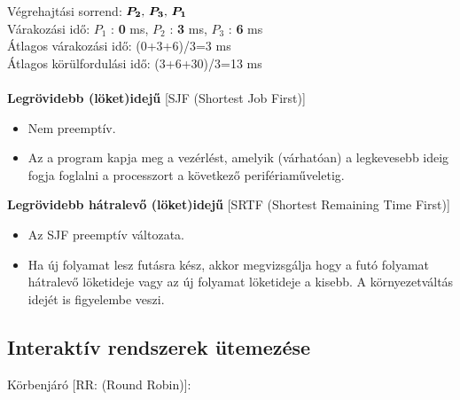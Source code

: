 \documentclass[tikz,12pt,margin=0px]{article}
\begin{document}
    \noindent Végrehajtási sorrend: $\boldsymbol{P_2$, $P_3$, $P_1}$\\
    \noindent Várakozási idő: $P_1$ : \textbf{0} ms, $P_2$ : \textbf{3} ms, $P_3$ : \textbf{6} ms\\

    \noindent Átlagos várakozási idő: (0+3+6)/3=3 ms\\
    \noindent Átlagos körülfordulási idő: (3+6+30)/3=13 ms\\\\

    \noindent \textbf{Legrövidebb (löket)idejű} [SJF (Shortest Job First)]

    \begin{itemize}[topsep=8pt,itemsep=4pt,partopsep=4pt, parsep=4pt]
        \item Nem preemptív.
        \item Az a program kapja meg a vezérlést, amelyik (várhatóan) a legkevesebb ideig fogja foglalni a processzort a következő perifériaműveletig.
    \end{itemize}

    \noindent \textbf{Legrövidebb hátralevő (löket)idejű} [SRTF (Shortest Remaining Time First)]

    \begin{itemize}[topsep=8pt,itemsep=4pt,partopsep=4pt, parsep=4pt]
        \item Az SJF preemptív változata.
        \item Ha új folyamat lesz futásra kész, akkor megvizsgálja hogy a futó folyamat hátralevő löketideje vagy az új folyamat löketideje a kisebb. A környezetváltás idejét is figyelembe veszi.
    \end{itemize}

    \subsection*{Interaktív rendszerek ütemezése\\}

    \noindent Körbenjáró [RR: (Round Robin)]:
\end{document}
